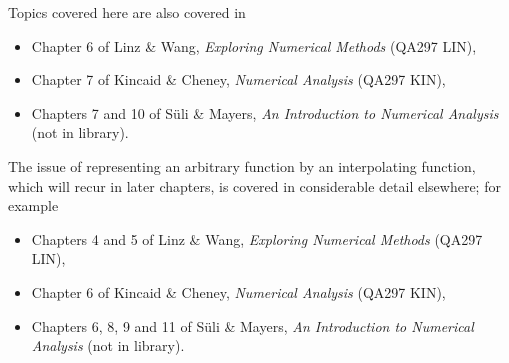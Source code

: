Topics covered here are also covered in
\begin{itemize}
\item Chapter 6 of Linz \& Wang, \textit{Exploring Numerical
    Methods} (QA297 LIN),
\item Chapter 7 of Kincaid \& Cheney, \textit{Numerical Analysis}
  (QA297 KIN),
\item Chapters 7 and 10 of S{\"u}li \& Mayers, \textit{An Introduction
    to Numerical Analysis} (not in library).
\end{itemize}

The issue of representing an arbitrary function by an interpolating
function, which will recur in later chapters, is covered in
considerable detail elsewhere; for example\begin{itemize}
\item Chapters 4 and 5 of Linz \& Wang, \textit{Exploring Numerical
    Methods} (QA297 LIN),
\item Chapter 6 of Kincaid \& Cheney, \textit{Numerical Analysis}
  (QA297 KIN),
\item Chapters 6, 8, 9 and 11 of S{\"u}li \& Mayers, \textit{An Introduction
    to Numerical Analysis} (not in library).
\end{itemize}
